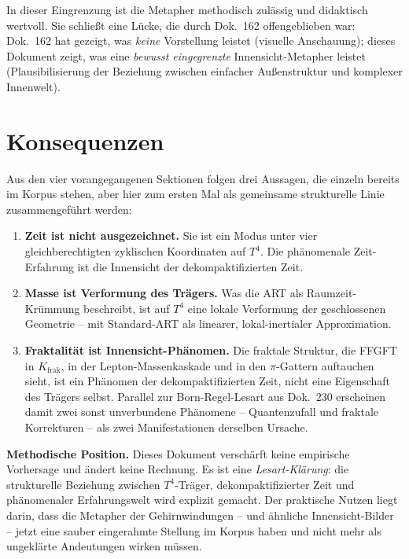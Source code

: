 In dieser Eingrenzung ist die Metapher methodisch zulässig und
didaktisch wertvoll. Sie schließt eine Lücke, die durch Dok.~162
offengeblieben war: Dok.~162 hat gezeigt, was \emph{keine} Vorstellung
leistet (visuelle Anschauung); dieses Dokument zeigt, was eine
\emph{bewusst eingegrenzte} Innensicht-Metapher leistet (Plausibilisierung
der Beziehung zwischen einfacher Außenstruktur und komplexer Innenwelt).

\section{Konsequenzen}

Aus den vier vorangegangenen Sektionen folgen drei Aussagen, die
einzeln bereits im Korpus stehen, aber hier zum ersten Mal als
gemeinsame strukturelle Linie zusammengeführt werden:

\begin{enumerate}[leftmargin=2em,itemsep=4pt,topsep=4pt]
  \item \textbf{Zeit ist nicht ausgezeichnet.} Sie ist ein Modus
        unter vier gleichberechtigten zyklischen Koordinaten auf
        $T^4$. Die phänomenale Zeit-Erfahrung ist die Innensicht
        der dekompaktifizierten Zeit.

  \item \textbf{Masse ist Verformung des Trägers.} Was die ART als
        Raumzeit-Krümmung beschreibt, ist auf $T^4$ eine lokale
        Verformung der geschlossenen Geometrie -- mit Standard-ART
        als linearer, lokal-inertialer Approximation.

  \item \textbf{Fraktalität ist Innensicht-Phänomen.} Die fraktale
        Struktur, die FFGFT in $K_{\text{frak}}$, in der
        Lepton-Massenkaskade und in den $\pi$-Gattern auftauchen
        sieht, ist ein Phänomen der dekompaktifizierten Zeit, nicht
        eine Eigenschaft des Trägers selbst. Parallel zur
        Born-Regel-Lesart aus Dok.~230 erscheinen damit zwei sonst
        unverbundene Phänomene -- Quantenzufall und fraktale
        Korrekturen -- als zwei Manifestationen derselben Ursache.
\end{enumerate}

\textbf{Methodische Position.} Dieses Dokument verschärft keine
empirische Vorhersage und ändert keine Rechnung. Es ist eine
\emph{Lesart-Klärung}: die strukturelle Beziehung zwischen
$T^4$-Träger, dekompaktifizierter Zeit und phänomenaler
Erfahrungswelt wird explizit gemacht. Der praktische Nutzen liegt
darin, dass die Metapher der Gehirnwindungen -- und ähnliche
Innensicht-Bilder -- jetzt eine sauber eingerahmte Stellung im
Korpus haben und nicht mehr als ungeklärte Andeutungen wirken
müssen.

